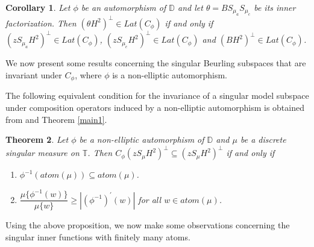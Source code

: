 \documentclass[12pt, reqno]{amsart}
\newtheorem{theorem}{Theorem}[section]
\newtheorem{corollary}[theorem]{Corollary}
\theoremstyle{definition}
\numberwithin{equation}{section}
\begin{document}
\begin{corollary}\label{split2}
	Let $\phi$ be an automorphism of $\mathbb{D}$ and let $ \theta=BS_{\mu_a}S_{\mu_c}$ be its inner
	factorization.  Then
	$(\theta H^2)^\perp \in Lat( C_\phi)$  if and only if  $(zS_{\mu_a} H^2)^\perp \in Lat( C_\phi)$,
	$(zS_{\mu_c} H^2)^\perp \in Lat( C_\phi)$ and $(B H^2)^\perp \in Lat( C_\phi)$.
\end{corollary}






We now present some results concerning the singular Beurling subspaces that are invariant under $C_\phi$, where $\phi$ is a non-elliptic automorphism.


 
The following equivalent condition for the invariance of a singular model subspace under composition operators induced by a non-elliptic automorphism is obtained from \cite[Corollary 2.15]{valentine} and Theorem \ref{main1}.
\begin{theorem}\label{pure}
	Let $\phi$ be a non-elliptic automorphism of $\mathbb{D}$ and $\mu$ be a discrete singular measure on $\mathbb{T}$. Then $C_{\phi}(zS_{\mu}H^2)^{\perp}\subseteq(zS_{\mu}H^2)^{\perp}$
	if and only if 
	\begin{enumerate}
		\item $\phi^{-1}(atom(\mu))\subseteq{atom(\mu)}$.
		\item $\dfrac{\mu\{\phi^{-1}(w)\}}{\mu\{w\}}\geq |({\phi^{-1}})^{'}(w)|$ for all $w \in atom{(\mu)}$.
	\end{enumerate}
\end{theorem}
Using the above proposition, we now make some observations concerning the singular inner functions with finitely many atoms.

	
\end{document}
